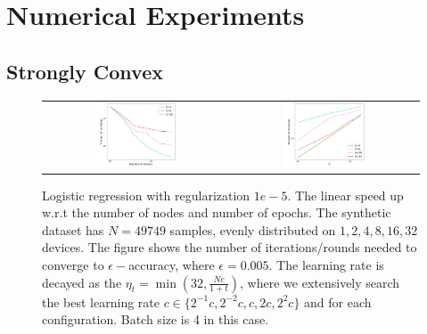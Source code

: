 


\section{Numerical Experiments}



\subsection{Strongly Convex}

\begin{figure}[h!]
\centering
\begin{tabular}{cc}
	\includegraphics[width=0.45\textwidth]{fig/paper-stronglycvxsmthspeedupNodesT-min-w8a-epsilon0131-reg1e-05.pdf} & 
\includegraphics[width=0.45\textwidth]{fig/paper-stronglycvxsmthspeedupEpochsT-min-w8a-epsilon0131-reg1e-05.pdf} \\
\end{tabular}
	\caption{Logistic regression with regularization $1e-5$. The linear speed up w.r.t the number of nodes and number of epochs. The synthetic dataset has $N=49749$ samples, evenly distributed on $1, 2, 4, 8, 16, 32$ devices. The figure shows the number of iterations/rounds needed to converge to $\epsilon-$accuracy, where $\epsilon=0.005$. The learning rate is decayed as the $\eta_t = \min(32, \frac{Nc}{1 + t})$, where we extensively search the best learning rate $c \in \{2^{-1}c, 2^{-2}c, c, 2c, 2^{2}c\}$ and for each configuration. Batch size is 4 in this case.}
\end{figure}



